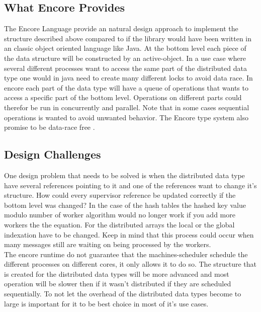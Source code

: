 \subsection{What Encore Provides}
The Encore Language provide an natural design approach to implement the structure described above compared to if the library would have been written in an classic object oriented language like Java. At the bottom level each piece of the data structure will be constructed by an active-object. In a use case where several different processes want to access the same part of the distributed data type one would in java need to create many different locks to avoid data race. In encore each part of the data type will have a queue of operations that wants to access a specific part of the bottom level. Operations on different parts could therefor be run in concurrently and parallel. Note that in some cases sequential operations is wanted to avoid unwanted behavior. The Encore type system also promise to be data-race free \cite{encore}.

\subsection{Design Challenges}
One design problem that needs to be solved is when the distributed data type have several references pointing to it and one of the references want to change it’s structure. How could every supervisor reference be updated correctly if the bottom level was changed? In the case of the hash tables the hashed key value modulo number of worker algorithm would no longer work if you add more workers the the equation. For the distributed arrays the local or the global indexation have to be changed. Keep in mind that this process could occur when many messages still are waiting on being processed by the workers. \\

The encore runtime do not guarantee that the machines-scheduler schedule the different processes on different cores, it only allows it to do so. The structure that is created for the distributed data types will be more advanced and most operation will be slower then if it wasn't distributed if they are scheduled sequentially. To not let the overhead of the distributed data types become to large is important for it to be best choice in most of it's use cases. 



